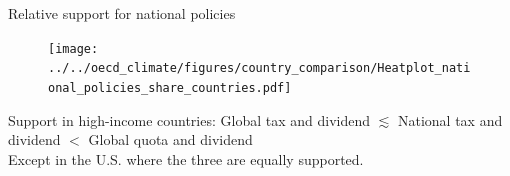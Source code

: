 \documentclass[aspectratio=169,xcolor=dvipsnames, 11pt,mathserif]{beamer}
\begin{document}
\begin{framefont}{\small}


\begin{frame}{Relative support for national policies\label{national_policies} \hyperlink{global_policies}{}} 
	\begin{figure}[h!]
	\centering
	\texttt{[image: ../../oecd\_climate/figures/country\_comparison/Heatplot\_national\_policies\_share\_countries.pdf]}
	\end{figure}
    Support in high-income countries: Global tax and dividend $\lesssim$ National tax and dividend $<$ Global quota and dividend \\ Except in the U.S. where the three are equally supported.
\end{frame}


\end{framefont}
\end{document}

